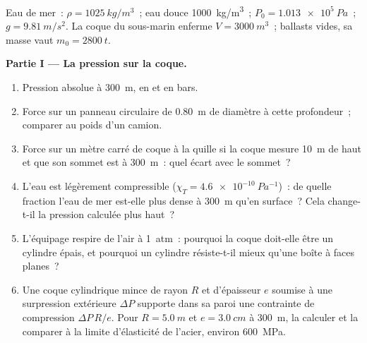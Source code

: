 \begin{problem}
\label{pb:b1:fluid-statics:1}
Eau de mer~: $\rho = \qty{1025}{kg/m^3}$~; eau douce \qty{1000}{kg/m^3}~;
$P_0 = \qty{1.013e5}{Pa}$~; $g = \qty{9.81}{m/s^2}$. La coque du sous-marin
enferme $V = \qty{3000}{m^3}$~; ballasts vides, sa masse vaut
$m_0 = \qty{2800}{t}$.

\medskip
\noindent\textbf{Partie I --- La pression sur la coque.}
\begin{enumerate}
  \item Pression absolue à \qty{300}{m}, en  et en bars.
  \item Force sur un panneau circulaire de \qty{0.80}{m} de diamètre à cette
        profondeur~; comparer au poids d'un camion.
  \item Force sur un mètre carré de coque à la quille si la coque mesure
        \qty{10}{m} de haut et que son sommet est à \qty{300}{m}~: quel écart
        avec le sommet~?
  \item L'eau est légèrement compressible ($\chi_T = \qty{4.6e-10}{Pa^{-1}}$)~:
        de quelle fraction l'eau de mer est-elle plus dense à \qty{300}{m}
        qu'en surface~? Cela change-t-il la pression calculée plus haut~?
  \item L'équipage respire de l'air à \qty{1}{atm}~: pourquoi la coque
        doit-elle être un cylindre épais, et pourquoi un cylindre résiste-t-il
        mieux qu'une boîte à faces planes~?
  \item Une coque cylindrique mince de rayon $R$ et d'épaisseur $e$ soumise
        à une surpression extérieure $\Delta P$ supporte dans sa paroi une
        contrainte de compression $\Delta P\,R/e$. Pour $R = \qty{5.0}{m}$ et
        $e = \qty{3.0}{cm}$ à \qty{300}{m}, la calculer et la comparer à la
        limite d'élasticité de l'acier, environ \qty{600}{MPa}.
\end{enumerate}


\end{problem}
